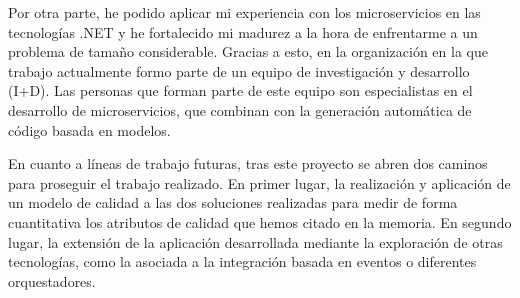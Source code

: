 \documentclass[11pt,spanish,listoffigures]{tfgetsinf}
\begin{document}
Por otra parte, he podido aplicar mi experiencia con los microservicios en las tecnologías .NET y he fortalecido mi madurez a la hora de enfrentarme a un problema de tamaño considerable. Gracias a esto, en la organización en la que trabajo actualmente formo parte de un equipo de investigación y desarrollo (I+D). Las personas que forman parte de este equipo son especialistas en el desarrollo de microservicios, que combinan con la generación automática de código basada en modelos.

En cuanto a líneas de trabajo futuras, tras este proyecto se abren dos caminos para proseguir el trabajo realizado. En primer lugar, la realización y aplicación de un modelo de calidad a las dos soluciones realizadas para medir de forma cuantitativa los atributos de calidad que hemos citado en la memoria. En segundo lugar, la extensión de la aplicación desarrollada mediante la exploración de otras tecnologías, como la asociada a la integración basada en eventos o diferentes orquestadores.


\renewcommand{\bibname}{Referencias}
\end{document}
